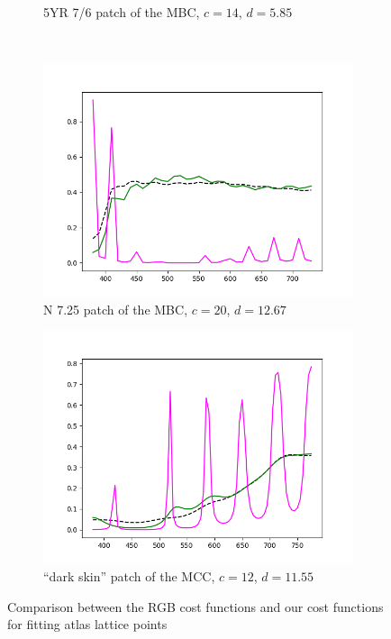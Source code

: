 \begin{figure}[t]
\begin{subfigure}[t]{0.45\textwidth}
		\caption{5YR 7/6 patch of the MBC, $c = 14$, $d = 5.85$}
		\label{fig:resultsCostFunctions_mcb0706}
	\end{subfigure} 
	\vspace{0.5em}\\
	\begin{subfigure}[t]{0.45\textwidth}
		\includegraphics[width=\linewidth]{img/results_costFunctions_mcb0725.png}
		\caption{N 7.25 patch of the MBC, $c = 20$, $d = 12.67$}
		\label{fig:resultsCostFunctions_mcb0725}
	\end{subfigure} \hspace{0.1em}
	\begin{subfigure}[t]{0.45\textwidth}
		\includegraphics[width=\linewidth]{img/results_costFunctions_darkskin.png}
		\caption{``dark skin'' patch of the MCC, $c = 12$, $d = 11.55$}
		\label{fig:resultsCostFunctions_darkskin}
	\end{subfigure}
	\caption{Comparison between the RGB cost functions and our cost functions for fitting atlas lattice points}
	\label{fig:resultsCostFunctions}
\end{figure}

